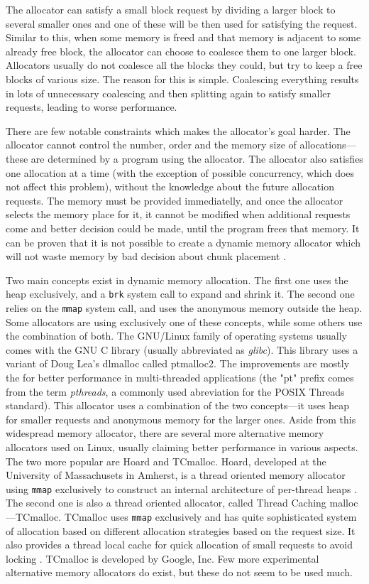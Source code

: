 The allocator can satisfy a small block request by dividing a larger block to several smaller ones and one of these will be then used for satisfying the request. Similar to this, when some memory is freed and that memory is adjacent to some already free block, the allocator can choose to coalesce them to one larger block. Allocators usually do not coalesce all the blocks they could, but try to keep a free blocks of various size. The reason for this is simple. Coalescing everything results in lots of unnecessary coalescing and then splitting again to satisfy smaller requests, leading to worse performance.  

There are few notable constraints which makes the allocator's goal harder. The allocator cannot control the number, order and the memory size of allocations---these are determined by a program using the allocator. The allocator also satisfies one allocation at a time (with the exception of possible concurrency, which does not affect this problem), without the knowledge about the future allocation requests. The memory must be provided immediatelly, and once the allocator selects the memory place for it, it cannot be modified when additional requests come and better decision could be made, until the program frees that memory. It can be proven that it is not possible to create a dynamic memory allocator which will not waste memory by bad decision about chunk placement \cite{DSAsurvey}.

Two main concepts exist in dynamic memory allocation. The first one uses the heap exclusively, and a {\tt brk} system call to expand and shrink it. The second one relies on the {\tt mmap} system call, and uses the anonymous memory outside the heap. Some allocators are using exclusively one of these concepts, while some others use the combination of both. The GNU/Linux family of operating systems usually comes with the GNU C library (usually abbreviated as {\em glibc}). This library uses a variant of Doug Lea's dlmalloc called ptmalloc2. The improvements are mostly the for better performance in multi-threaded applications (the "pt" prefix comes from the term {\em pthreads}, a commonly used abreviation for the POSIX Threads standard). This allocator uses a combination of the two concepts---it uses heap for smaller requests and anonymous memory for the larger ones. Aside from this widespread memory allocator, there are several more alternative memory allocators used on Linux, usually claiming better performance in various aspects. The two more popular are Hoard and TCmalloc. Hoard, developed at the University of Massachusets in Amherst, is a thread oriented memory allocator using {\tt mmap} exclusively to construct an internal architecture of per-thread heaps \cite{allocators:hoard}. The second one is also a thread oriented allocator, called Thread Caching malloc---TCmalloc. TCmalloc uses {\tt mmap} exclusively and has quite sophisticated system of allocation based on different allocation strategies based on the request size. It also provides a thread local cache for quick allocation of small requests to avoid locking \cite{tcmalloc}. TCmalloc is developed by Google, Inc. Few more experimental alternative memory allocators do exist, but these do not seem to be used much.

